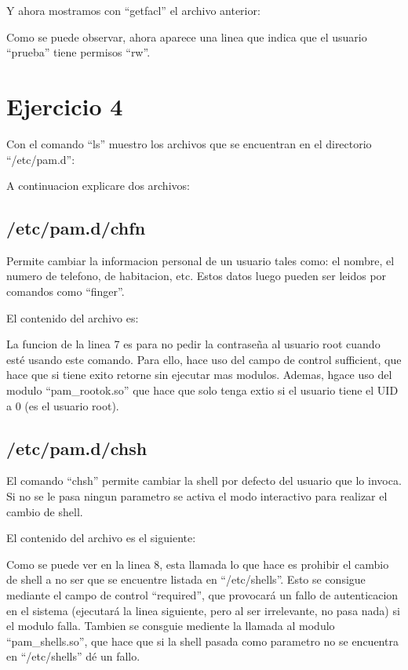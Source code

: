 \documentclass{article}
\begin{document}


Y ahora mostramos con ``getfacl'' el archivo anterior:


Como se puede observar, ahora aparece una linea que indica que el usuario ``prueba'' tiene permisos ``rw''.


\section{Ejercicio 4}
Con el comando ``ls'' muestro los archivos que se encuentran en el directorio ``/etc/pam.d'':


A continuacion explicare dos archivos:

\subsection{/etc/pam.d/chfn}
Permite cambiar la informacion personal de un usuario tales como: el nombre, el numero de telefono, de habitacion, etc. Estos datos luego pueden ser leidos por comandos como ``finger''.

El contenido del archivo es:


La funcion de la linea 7 es para no pedir la contraseña al usuario root cuando esté usando este comando. Para ello, hace uso del campo de control sufficient, que hace que si tiene exito retorne sin ejecutar mas modulos. Ademas, hgace uso del modulo ``pam\_rootok.so'' que hace que solo tenga extio si el usuario tiene el UID a 0 (es el usuario root).

\subsection{/etc/pam.d/chsh}
El comando ``chsh'' permite cambiar la shell por defecto del usuario que lo invoca. Si no se le pasa ningun parametro se activa el modo interactivo para realizar el cambio de shell.

El contenido del archivo es el siguiente:



Como se puede ver en la linea 8, esta llamada lo que hace es prohibir el cambio de shell a no ser que se encuentre listada en ``/etc/shells''. Esto se consigue mediante el campo de control ``required'', que provocará un fallo de autenticacion en el sistema (ejecutará la linea siguiente, pero al ser irrelevante, no pasa nada) si el modulo falla. Tambien se consguie mediente la llamada al modulo ``pam\_shells.so'', que hace que si la shell pasada como parametro no se encuentra en ``/etc/shells'' dé un fallo.
\end{document}
